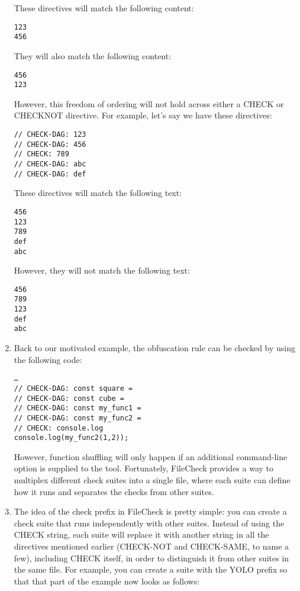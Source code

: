 \begin{enumerate}
These directives will match the following content:

\begin{lstlisting}[style=styleJavaScript]
123
456
\end{lstlisting}

They will also match the following content:

\begin{lstlisting}[style=styleJavaScript]
456
123
\end{lstlisting}

However, this freedom of ordering will not hold across either a CHECK or CHECKNOT directive. For example, let's say we have these directives:

\begin{lstlisting}[style=styleJavaScript]
// CHECK-DAG: 123
// CHECK-DAG: 456
// CHECK: 789
// CHECK-DAG: abc
// CHECK-DAG: def
\end{lstlisting}

These directives will match the following text:

\begin{lstlisting}[style=styleJavaScript]
456
123
789
def
abc
\end{lstlisting}

However, they will not match the following text:

\begin{lstlisting}[style=styleJavaScript]
456
789
123
def
abc
\end{lstlisting}

\item Back to our motivated example, the obfuscation rule can be checked by using the following code:

\begin{lstlisting}[style=styleJavaScript]
…
// CHECK-DAG: const square =
// CHECK-DAG: const cube =
// CHECK-DAG: const my_func1 =
// CHECK-DAG: const my_func2 =
// CHECK: console.log
console.log(my_func2(1,2));
\end{lstlisting}

However, function shuffling will only happen if an additional command-line option is supplied to the tool. Fortunately, FileCheck provides a way to multiplex different check suites into a single file, where each suite can define how it runs and separates the checks from other suites.

\item The idea of the check prefix in FileCheck is pretty simple: you can create a check suite that runs independently with other suites. Instead of using the CHECK string, each suite will replace it with another string in all the directives mentioned earlier (CHECK-NOT and CHECK-SAME, to name a few), including CHECK itself, in order to distinguish it from other suites in the same file. For example, you can create a suite with the YOLO prefix so that that part of the example now looks as follows:


\end{enumerate}
